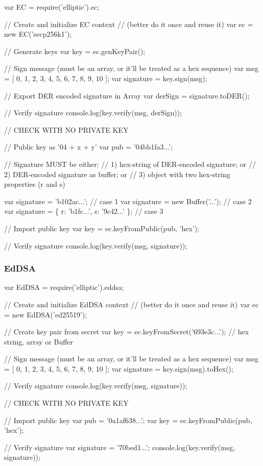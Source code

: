 \begin{DoxyCode}
var EC = require('elliptic').ec;

// Create and initialize EC context
// (better do it once and reuse it)
var ec = new EC('secp256k1');

// Generate keys
var key = ec.genKeyPair();

// Sign message (must be an array, or it'll be treated as a hex sequence)
var msg = [ 0, 1, 2, 3, 4, 5, 6, 7, 8, 9, 10 ];
var signature = key.sign(msg);

// Export DER encoded signature in Array
var derSign = signature.toDER();

// Verify signature
console.log(key.verify(msg, derSign));

// CHECK WITH NO PRIVATE KEY

// Public key as '04 + x + y'
var pub = '04bb1fa3...';

// Signature MUST be either:
// 1) hex-string of DER-encoded signature; or
// 2) DER-encoded signature as buffer; or
// 3) object with two hex-string properties (r and s)

var signature = 'b102ac...'; // case 1
var signature = new Buffer('...'); // case 2
var signature = \{ r: 'b1fc...', s: '9c42...' \}; // case 3

// Import public key
var key = ec.keyFromPublic(pub, 'hex');

// Verify signature
console.log(key.verify(msg, signature));
\end{DoxyCode}


\subsubsection*{Ed\+D\+SA}


\begin{DoxyCode}
var EdDSA = require('elliptic').eddsa;

// Create and initialize EdDSA context
// (better do it once and reuse it)
var ec = new EdDSA('ed25519');

// Create key pair from secret
var key = ec.keyFromSecret('693e3c...'); // hex string, array or Buffer

// Sign message (must be an array, or it'll be treated as a hex sequence)
var msg = [ 0, 1, 2, 3, 4, 5, 6, 7, 8, 9, 10 ];
var signature = key.sign(msg).toHex();

// Verify signature
console.log(key.verify(msg, signature));

// CHECK WITH NO PRIVATE KEY

// Import public key
var pub = '0a1af638...';
var key = ec.keyFromPublic(pub, 'hex');

// Verify signature
var signature = '70bed1...';
console.log(key.verify(msg, signature));
\end{DoxyCode}


